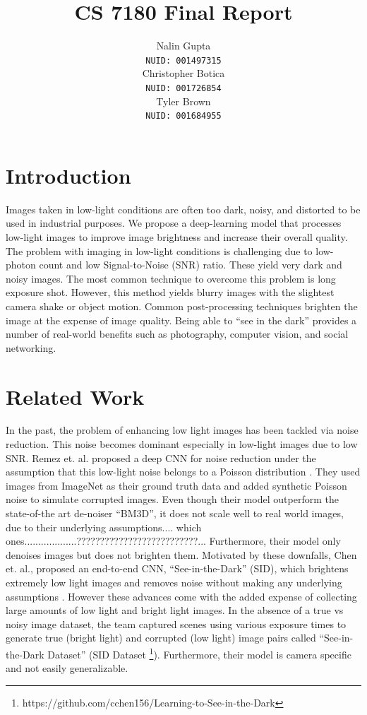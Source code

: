 \documentclass{article}
\title{CS 7180 Final Report}
\author{%
  Nalin Gupta \\
  \texttt{NUID: 001497315} \\
  \And
  Christopher Botica\\
  \texttt{NUID: 001726854} \\
  \And
  Tyler Brown\\
  \texttt{NUID: 001684955} \\
}
\begin{document}

\maketitle

\section{Introduction}

Images taken in low-light conditions are often too dark, noisy, and
distorted to be used in industrial purposes. We propose a deep-learning
model that processes low-light images to improve image brightness and
increase their overall quality. The problem with imaging in low-light
conditions is challenging due to low-photon count and low
Signal-to-Noise (SNR) ratio. These yield very dark and noisy images. The
most common technique to overcome this problem is long exposure shot.
However, this method yields blurry images with the slightest camera shake
or object motion\cite{chen2018learning}. Common post-processing
techniques brighten the image at the expense of image quality. Being able to
``see in the dark'' provides a number of real-world benefits such as
photography, computer vision, and social networking.

\section{Related Work}

In the past, the problem of enhancing low light images has been tackled via
noise reduction. This noise becomes dominant especially in low-light images
due to low SNR. Remez et. al. proposed a deep CNN for noise reduction under
the assumption that this low-light noise belongs to a Poisson
distribution \cite{remez2017deep}.  They used images from ImageNet
\cite{imagenet_cvpr09} as their ground truth data
and added synthetic Poisson noise to simulate corrupted images. Even though
their model outperform the state-of-the art de-noiser ``BM3D'', it does not
scale well to real world images, due to their underlying assumptions.... which ones...................??????????????????????????...
Furthermore, their model only denoises images but does not brighten them.
Motivated by these downfalls, Chen et. al., proposed an end-to-end CNN,
``See-in-the-Dark'' (SID), which brightens extremely low light images and
removes noise without making any underlying assumptions
\cite{chen2018learning}. However these advances come with the added expense
of collecting large amounts of low
light and bright light images. In the absence of a true vs noisy image
dataset, the team captured scenes using various exposure times to generate
true (bright light) and corrupted (low light) image pairs called
``See-in-the-Dark Dataset'' (SID Dataset
\footnote{https://github.com/cchen156/Learning-to-See-in-the-Dark}). Furthermore,
their model is camera specific and not easily generalizable.\newline
\end{document}
